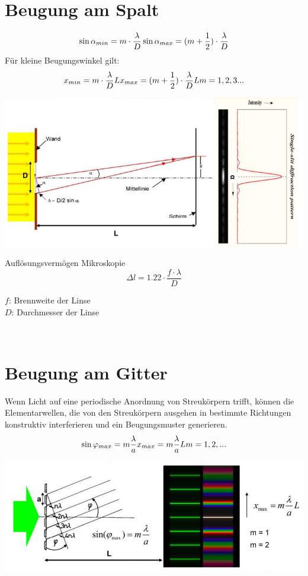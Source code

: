 \section{Beugung am Spalt}
\[
	\sin\alpha_{min}=m\cdot \frac{\lambda}{D} \\
	\sin\alpha_{max}=(m+\frac{1}{2})\cdot \frac{\lambda}{D}	
\]
Für kleine Beugungswinkel gilt:
\[
	x_{min}=m\cdot\frac{\lambda}{D}L\\
	x_{max}=(m+\frac{1}{2})\cdot\frac{\lambda}{D}L\\ \\
	m=1,2,3...
\]
\begin{center}
	\includegraphics[scale = 0.3]{../fig/beugung_spalt.jpg}
\end{center}
Auflösungsvermögen Mikroskopie
\[
	\Delta l=1.22 \cdot \frac{f\cdot\lambda}{D}
\]
\begin{footnotesize}
	$f$:	Brennweite der Linse \\
	$D$:	Durchmesser der Linse\\
\end{footnotesize}
\\
\section{Beugung am Gitter}
Wenn Licht auf eine periodische Anordnung von Streukörpern trifft, können die Elementarwellen, die von den Streukörpern ausgehen in bestimmte Richtungen konstruktiv interferieren und ein Beugungsmuster generieren.
\[
	\sin \varphi_{max}=m\frac{\lambda}{a} \\
	x_{max}=m\frac{\lambda}{a}L \\
	m=1,2,...
\]
\begin{center}
	\includegraphics[scale = 0.25]{../fig/beugung_gitter.jpg}
\end{center}
\
